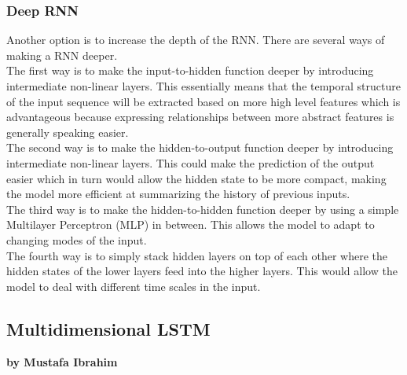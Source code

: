 \documentclass{article}
\begin{document}
\subsubsection{Deep RNN}
Another option is to increase the depth of the RNN. There are several ways of making a RNN deeper\cite{Pascanu2}.\\
The first way is to make the input-to-hidden function deeper by introducing intermediate non-linear layers. This essentially means that the temporal structure of the input sequence will be extracted based on more high level features which is advantageous because expressing relationships between more abstract features is generally speaking easier\cite{Mikolov}.\\
The second way is to make the hidden-to-output function deeper by introducing intermediate non-linear layers. This could make the prediction of the output easier which in turn would allow the hidden state to be more compact, making the model more efficient at summarizing the history of previous inputs.\\
The third way is to make the hidden-to-hidden function deeper by using a simple Multilayer Perceptron (MLP) in between. This allows the model to adapt to changing modes of the input.\\
The fourth way is to simply stack hidden layers on top of each other where the hidden states of the lower layers feed into the higher layers. This would allow the model to deal with different time scales in the input.
\subsection{Multidimensional LSTM}

\textbf{by Mustafa Ibrahim} \\
\end{document}
